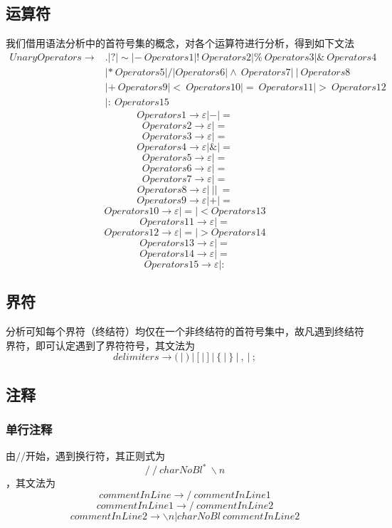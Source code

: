 \documentclass[UTF8]{ctexart}
\begin{document}
\subsection{运算符}
我们借用语法分析中的首符号集的概念，对各个运算符进行分析，得到如下文法
\begin{equation}
	\begin{aligned}
		UnaryOperators \rightarrow & . | ? | \sim | - \ Operators1 | ! \ Operators2 | \% \ Operators3 | \& \ Operators4 \\
		                           & | * \ Operators5 | / | Operators6 | \wedge \ Operators7 | \ | \ Operators8         \\
		                           & | + \ Operators9 | < \ Operators10 | = \ Operators11 | > \ Operators12             \\
		                           & | \colon \ Operators15
	\end{aligned}
\end{equation}
$$ Operators1 \rightarrow \varepsilon | - | = $$
$$ Operators2 \rightarrow \varepsilon | = $$
$$ Operators3 \rightarrow \varepsilon | = $$
$$ Operators4 \rightarrow \varepsilon | \& | = $$
$$ Operators5 \rightarrow \varepsilon | = $$
$$ Operators6 \rightarrow \varepsilon | = $$
$$ Operators7 \rightarrow \varepsilon | = $$
$$ Operators8 \rightarrow \varepsilon | \ | | \ = $$
$$ Operators9 \rightarrow \varepsilon | + | = $$
$$ Operators10 \rightarrow \varepsilon | = | < Operators13 $$
$$ Operators11 \rightarrow \varepsilon | = $$
$$ Operators12 \rightarrow \varepsilon | = | > Operators14 $$
$$ Operators13 \rightarrow \varepsilon | = $$
$$ Operators14 \rightarrow \varepsilon | = $$
$$ Operators15 \rightarrow \varepsilon | \colon $$
\subsection{界符}
分析可知每个界符（终结符）均仅在一个非终结符的首符号集中，故凡遇到终结符界符，即可认定遇到了界符符号，其文法为
$$ delimiters \rightarrow (  \ | \  )  \ | \  [  \ | \  ]  \ | \  \{  \ | \  \}  \ | \  ,  \ | \  ; $$
\subsection{注释}
\subsubsection{单行注释}
由$//$开始，遇到换行符，其正则式为
$$ / \ / \ {charNoBl}^* \ \backslash n $$
，其文法为
$$ commentInLine \rightarrow / \ commentInLine1 $$
$$ commentInLine1 \rightarrow / \ commentInLine2 $$
$$ commentInLine2 \rightarrow \backslash n | charNoBl \ commentInLine2 $$
\end{document}
